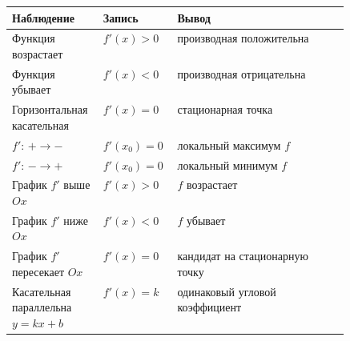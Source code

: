\documentclass[a4paper,12pt]{article}
\begin{document}
\begin{center}
\renewcommand{\arraystretch}{1.45}
\begin{tabularx}{\linewidth}{
>{\raggedright\arraybackslash}p{0.27\linewidth}
>{\centering\arraybackslash}p{0.22\linewidth}
X}
\toprule
Наблюдение & Запись & Вывод \\
\midrule

Функция возрастает
&
\(f'(x)>0\)
&
производная положительна
\\

Функция убывает
&
\(f'(x)<0\)
&
производная отрицательна
\\

Горизонтальная касательная
&
\(f'(x)=0\)
&
стационарная точка
\\

\(f'\): \(+\to-\)
&
\(f'(x_0)=0\)
&
локальный максимум \(f\)
\\

\(f'\): \(-\to+\)
&
\(f'(x_0)=0\)
&
локальный минимум \(f\)
\\

График \(f'\) выше \(Ox\)
&
\(f'(x)>0\)
&
\(f\) возрастает
\\

График \(f'\) ниже \(Ox\)
&
\(f'(x)<0\)
&
\(f\) убывает
\\

График \(f'\) пересекает \(Ox\)
&
\(f'(x)=0\)
&
кандидат на стационарную точку
\\

Касательная параллельна \(y=kx+b\)
&
\(f'(x)=k\)
&
одинаковый угловой коэффициент
\\

\bottomrule
\end{tabularx}
\end{center}
\end{document}

